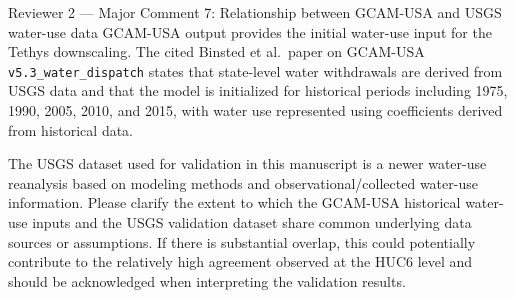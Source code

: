\documentclass[11pt,letterpaper]{article}
\begin{document}
\begin{commentbox}[label={r2:maj7}]{Reviewer 2 --- Major Comment 7: Relationship between GCAM-USA and USGS water-use data}
GCAM-USA output provides the initial water-use input for the Tethys downscaling. The cited Binsted et al.\ paper on GCAM-USA \texttt{v5.3\_water\_dispatch} states that state-level water withdrawals are derived from USGS data and that the model is initialized for historical periods including 1975, 1990, 2005, 2010, and 2015, with water use represented using coefficients derived from historical data.

The USGS dataset used for validation in this manuscript is a newer water-use reanalysis based on modeling methods and observational/collected water-use information. Please clarify the extent to which the GCAM-USA historical water-use inputs and the USGS validation dataset share common underlying data sources or assumptions. If there is substantial overlap, this could potentially contribute to the relatively high agreement observed at the HUC6 level and should be acknowledged when interpreting the validation results.
\end{commentbox}
\end{document}
